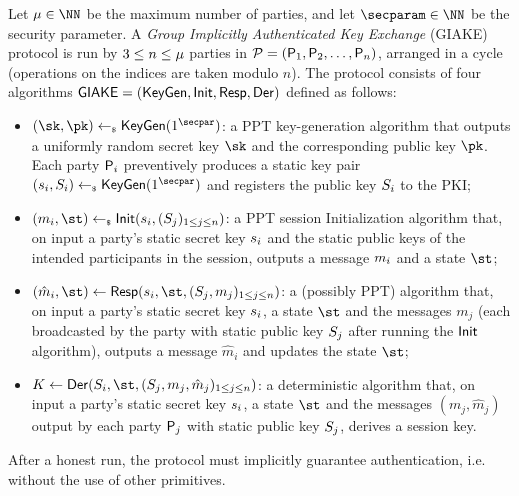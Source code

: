 \begin{plaindef}[GIAKE]\label{def:GKE}
	Let $\projectKey \in \NN$ be the maximum number of parties, and let $\secparam\in \NN$ be the security parameter. 
	A \textit{Group Implicitly Authenticated Key Exchange} (GIAKE) protocol is run by $3\leq n \leq \maxusers$ parties in $\PartySet = (\Party_1,\allowbreak \Party_2,\dots,\Party_n)$, arranged in a cycle (operations on the indices are taken modulo $n$).
	The protocol consists of four algorithms $\GIAKE = (\KeyGen, \GAKEIni, \GAKERes, \GAKEDer)$ defined as follows:
	\begin{itemize}
		\item $(\sk,\pk) \getsr \KeyGen(1^\secpar)$: a PPT key-generation algorithm that outputs a uniformly random secret key $\sk$ and the corresponding public key $\pk$.
		Each party $\User[i]$ preventively produces a static key pair $(\ssk_i,\spk_i) \getsr \KeyGen(1^\secpar)$ and registers the public key $\spk_i$ to the PKI;
		\item $(m_i,\st) \getsr \GAKEIni (\ssk_i,(\spk_j)_{1\leq j \leq n})$: a PPT session Initialization algorithm that, on input a party's static secret key $\ssk_i$ and the static public keys of the intended participants in the session, outputs a message $\messageIni$ and a state $\st$;
		\item $(\hat{m}_i,\st) \gets \GAKERes(\ssk_i,\st,(\spk_j,m_j)_{1\leq j \leq n})$: a (possibly PPT) algorithm that, on input a party's static secret key $\ssk_i$, a state $\st$ and the messages $m_j$ (each broadcasted by the party with static public key $\spk_j$ after running the $\GAKEIni$ algorithm), outputs a message $\hat{m}_i$ and updates the state $\st$;
		\item $K \gets \GAKEDer (\spk_i,\st,(\spk_j,m_j,\hat{m}_j)_{1\leq j \leq n})$: a deterministic algorithm that,  on input a party's static secret key $\ssk_i$, a state $\st$ and the messages $(m_j,\hat{m}_j)$ output by each party $\User[j]$ with static public key $\spk_j$, derives a session key.
	\end{itemize}
	After a honest run, the protocol must implicitly guarantee authentication, i.e. without the use of other primitives.
\end{plaindef}	

